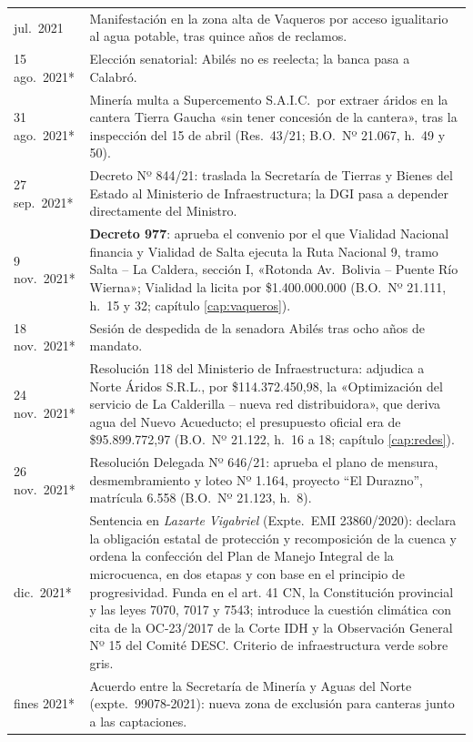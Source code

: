 \begin{longtable}{@{}p{2.7cm}p{10.3cm}@{}}
jul.\ 2021 & Manifestación en la zona alta de Vaqueros por acceso igualitario al agua potable, tras quince años de reclamos. \\
15 ago.\ 2021* & Elección senatorial: Abilés no es reelecta; la banca pasa a Calabró. \\
31 ago.\ 2021* & Minería multa a Supercemento S.A.I.C.\ por extraer áridos en la cantera Tierra Gaucha «sin tener concesión de la cantera», tras la inspección del 15 de abril (Res.\ 43/21; B.O.\ Nº 21.067, h.\ 49 y 50). \\
27 sep.\ 2021* & Decreto Nº 844/21: traslada la Secretaría de Tierras y Bienes del Estado al Ministerio de Infraestructura; la DGI pasa a depender directamente del Ministro. \\
9 nov.\ 2021* & \textbf{Decreto 977}: aprueba el convenio por el que Vialidad Nacional financia y Vialidad de Salta ejecuta la Ruta Nacional 9, tramo Salta -- La Caldera, sección I, «Rotonda Av.\ Bolivia -- Puente Río Wierna»; Vialidad la licita por \$1.400.000.000 (B.O.\ Nº 21.111, h.\ 15 y 32; capítulo \ref{cap:vaqueros}). \\
18 nov.\ 2021* & Sesión de despedida de la senadora Abilés tras ocho años de mandato. \\
24 nov.\ 2021* & Resolución 118 del Ministerio de Infraestructura: adjudica a Norte Áridos S.R.L., por \$114.372.450,98, la «Optimización del servicio de La Calderilla -- nueva red distribuidora», que deriva agua del Nuevo Acueducto; el presupuesto oficial era de \$95.899.772,97 (B.O.\ Nº 21.122, h.\ 16 a 18; capítulo \ref{cap:redes}). \\
26 nov.\ 2021* & Resolución Delegada Nº 646/21: aprueba el plano de mensura, desmembramiento y loteo Nº 1.164, proyecto ``El Durazno'', matrícula 6.558 (B.O.\ Nº 21.123, h.\ 8). \\
dic.\ 2021* & Sentencia en \textit{Lazarte Vigabriel} (Expte.\ EMI 23860/2020): declara la obligación estatal de protección y recomposición de la cuenca y ordena la confección del Plan de Manejo Integral de la microcuenca, en dos etapas y con base en el principio de progresividad. Funda en el art. 41 CN, la Constitución provincial y las leyes 7070, 7017 y 7543; introduce la cuestión climática con cita de la OC-23/2017 de la Corte IDH y la Observación General Nº 15 del Comité DESC. Criterio de infraestructura verde sobre gris. \\
fines 2021* & Acuerdo entre la Secretaría de Minería y Aguas del Norte (expte.\ 99078-2021): nueva zona de exclusión para canteras junto a las captaciones. \\

\end{longtable}
